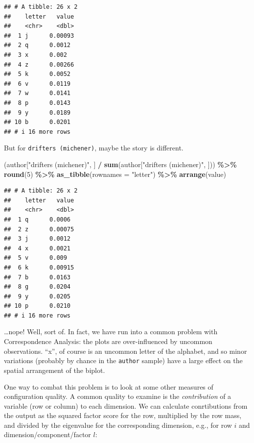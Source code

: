 \documentclass[
]{book}
\newenvironment{Shaded}{\begin{snugshade}}{\end{snugshade}}
\newcommand{\AttributeTok}[1]{\textcolor[rgb]{0.13,0.29,0.53}{#1}}
\newcommand{\DecValTok}[1]{\textcolor[rgb]{0.00,0.00,0.81}{#1}}
\newcommand{\FunctionTok}[1]{\textcolor[rgb]{0.13,0.29,0.53}{\textbf{#1}}}
\newcommand{\NormalTok}[1]{#1}
\newcommand{\SpecialCharTok}[1]{\textcolor[rgb]{0.81,0.36,0.00}{\textbf{#1}}}
\newcommand{\StringTok}[1]{\textcolor[rgb]{0.31,0.60,0.02}{#1}}
\begin{document}
\begin{verbatim}
## # A tibble: 26 x 2
##    letter   value
##    <chr>    <dbl>
##  1 j      0.00093
##  2 q      0.0012 
##  3 x      0.002  
##  4 z      0.00266
##  5 k      0.0052 
##  6 v      0.0119 
##  7 w      0.0141 
##  8 p      0.0143 
##  9 y      0.0189 
## 10 b      0.0201 
## # i 16 more rows
\end{verbatim}

But for \texttt{drifters\ (michener)}, maybe the story is different.

\begin{Shaded}
\begin{Highlighting}[]
\NormalTok{(author[}\StringTok{"drifters (michener)"}\NormalTok{, ] }\SpecialCharTok{/} \FunctionTok{sum}\NormalTok{(author[}\StringTok{"drifters (michener)"}\NormalTok{, ])) }\SpecialCharTok{\%\textgreater{}\%}
  \FunctionTok{round}\NormalTok{(}\DecValTok{5}\NormalTok{) }\SpecialCharTok{\%\textgreater{}\%}
  \FunctionTok{as\_tibble}\NormalTok{(}\AttributeTok{rownames =} \StringTok{"letter"}\NormalTok{) }\SpecialCharTok{\%\textgreater{}\%}
  \FunctionTok{arrange}\NormalTok{(value)}
\end{Highlighting}
\end{Shaded}

\begin{verbatim}
## # A tibble: 26 x 2
##    letter   value
##    <chr>    <dbl>
##  1 q      0.0006 
##  2 z      0.00075
##  3 j      0.0012 
##  4 x      0.0021 
##  5 v      0.009  
##  6 k      0.00915
##  7 b      0.0163 
##  8 g      0.0204 
##  9 y      0.0205 
## 10 p      0.0210 
## # i 16 more rows
\end{verbatim}

\ldots nope! Well, sort of. In fact, we have run into a common problem with Correspondence Analysis: the plots are over-influenced by uncommon observations. ``x'', of course is an uncommon letter of the alphabet, and so minor variations (probably by chance in the \texttt{author} sample) have a large effect on the spatial arrangement of the biplot.

One way to combat this problem is to look at some other measures of configuration quality. A common quality to examine is the \emph{contribution} of a variable (row or column) to each dimension. We can calculate conrtibutions from the output as the squared factor score for the row, multiplied by the row mass, and divided by the eigenvalue for the corresponding dimension, e.g., for row \(i\) and dimension/component/factor \(l\):
\end{document}
